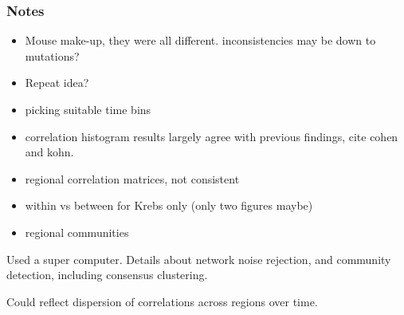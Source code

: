 \documentclass[a4paper,12pt]{article}
\theoremstyle{definition}
\begin{document}
\subsubsection*{Notes}
\begin{itemize}
  \item Mouse make-up, they were all different. inconsistencies may be down to mutations?

  \item Repeat idea?

  \item picking suitable time bins

  \item correlation histogram results largely agree with previous findings, cite cohen and kohn.

  \item regional correlation matrices, not consistent

  \item within vs between for Krebs only (only two figures maybe)

  \item regional communities 
\end{itemize}



Used a super computer. Details about network noise rejection, and community detection, including consensus clustering.

Could reflect dispersion of correlations across regions over time.


\end{document}
